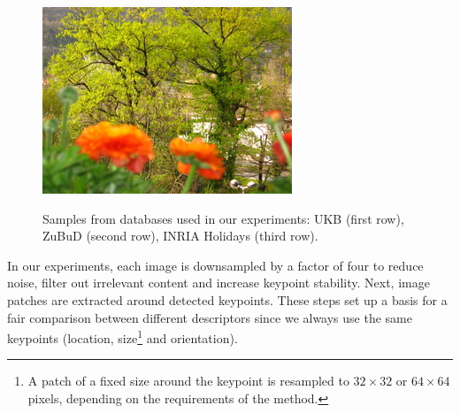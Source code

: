 \documentclass[twocolumn]{article}
\begin{document}
\begin{figure}
{				\includegraphics[scale=0.82]{inria6.jpg}
			}

			\caption
			{
				Samples from databases used in our experiments:
				UKB \cite{ukb} (first row),
				ZuBuD \cite{zubud} (second row),
				INRIA Holidays \cite{holidays} (third row).
			}
			\label{fig:databases}
		\end{figure}

		In our experiments, each image is downsampled by a factor of four to reduce noise, filter out irrelevant content and increase keypoint stability.
		Next, image patches are extracted around detected keypoints.
		These steps set up a basis for a fair comparison between different descriptors since we always use the same keypoints
		(location, size\footnote{A patch of a fixed size around the keypoint is resampled to $32\times 32$ or $64\times 64$ pixels, depending on the requirements of the method.} and orientation).
\end{document}
